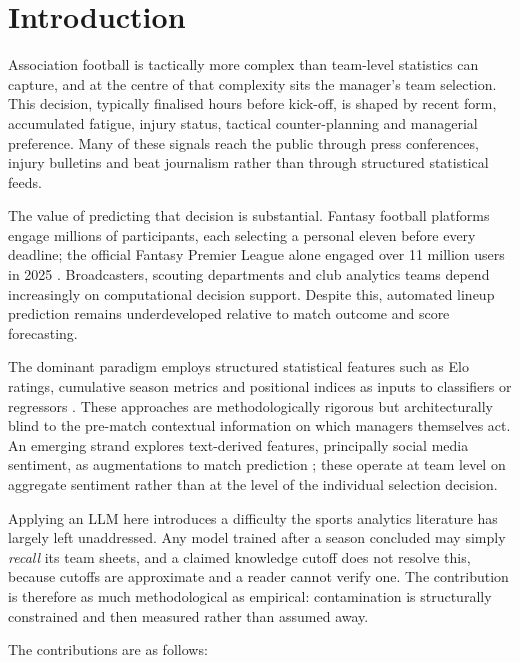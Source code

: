 \documentclass[conference]{IEEEtran}
\begin{document}
\section{Introduction}

Association football is tactically more complex than team-level statistics can capture, and at the centre of that complexity sits the manager's team selection. This decision, typically finalised hours before kick-off, is shaped by recent form, accumulated fatigue, injury status, tactical counter-planning and managerial preference. Many of these signals reach the public through press conferences, injury bulletins and beat journalism rather than through structured statistical feeds.

The value of predicting that decision is substantial. Fantasy football platforms engage millions of participants, each selecting a personal eleven before every deadline; the official Fantasy Premier League alone engaged over 11 million users in 2025 \cite{ramezanidinh2025}. Broadcasters, scouting departments and club analytics teams depend increasingly on computational decision support. Despite this, automated lineup prediction remains underdeveloped relative to match outcome and score forecasting.

The dominant paradigm employs structured statistical features such as Elo ratings, cumulative season metrics and positional indices as inputs to classifiers or regressors \cite{hvattumarntzen2010, debdas2026, peterspacheco2023}. These approaches are methodologically rigorous but architecturally blind to the pre-match contextual information on which managers themselves act. An emerging strand explores text-derived features, principally social media sentiment, as augmentations to match prediction \cite{wunderlichmemmert2022}; these operate at team level on aggregate sentiment rather than at the level of the individual selection decision.

Applying an LLM here introduces a difficulty the sports analytics literature has largely left unaddressed. Any model trained after a season concluded may simply \emph{recall} its team sheets, and a claimed knowledge cutoff does not resolve this, because cutoffs are approximate and a reader cannot verify one. The contribution is therefore as much methodological as empirical: contamination is structurally constrained and then measured rather than assumed away.

The contributions are as follows:
\end{document}
